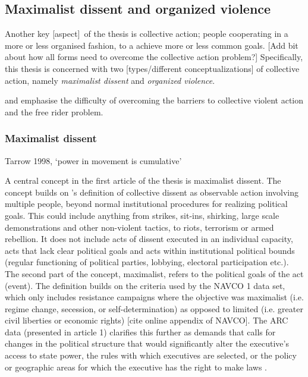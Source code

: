\documentclass[12pt]{article}
\begin{document}
\subsection{Maximalist dissent and organized violence}
\label{Maximalist dissent and organized violence}

Another key [aspect] of the thesis is collective action; people cooperating in a
more or less organised fashion, to a achieve more or less common goals. [Add bit
about how all forms need to overcome the collective action problem?]
Specifically, this thesis is concerned with two [types/different
conceptualizations] of collective action, namely \textit{maximalist dissent} and
\textit{organized violence}.

\citet{OlsonMancur1965TLoC} and \citet{Tullock_1971}
emphasise the difficulty of overcoming the barriers to collective violent action
and the free rider problem.

\subsubsection{Maximalist dissent} \label{Maximalist dissent}

Tarrow 1998, `power in movement is cumulative'

A central concept in the first article of the thesis is maximalist dissent. The
concept builds on \citet{TillyCharles1978Fmtr}'s definition of collective
dissent as observable action involving multiple people, beyond normal
institutional procedures for realizing political goals. This could include
anything from strikes, sit-ins, shirking, large scale demonstrations and other
non-violent tactics, to riots, terrorism or armed rebellion. It does not include
acts of dissent executed in an individual capacity, acts that lack clear
political goals and acts within institutional political bounds (regular
functioning of political parties, lobbying, electoral participation etc.). The
second part of the concept, maximalist, refers to the political goals of the act
(event). The definition builds on the criteria used by the NAVCO 1 data set,
which only includes resistance campaigns where the objective was maximalist
(i.e. regime change, secession, or self-determination) as opposed to limited
(i.e. greater civil liberties or economic rights) [cite online appendix of
NAVCO]. The ARC data (presented in article 1) clarifies this further as demands
that calls for changes in the political structure that would significantly alter
the executive’s access to state power, the rules with which executives are
selected, or the policy or geographic areas for which the executive has the
right to make laws \citep{Butcher_2022}.
\end{document}

